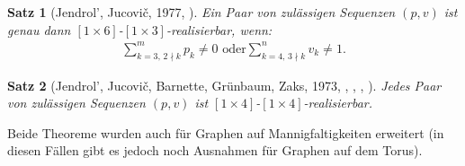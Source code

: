 \documentclass[10pt, notheorems]{beamer}
\newtheorem{theorem}{Satz}[section]
\begin{document}
\begin{frame}
  \begin{theorem}[{\sc Jendrol', Jucovi{\v{c}}}, 1977, \cite{jendrol1977generalization}] \label{thm:eberhard:extended:3}
    Ein Paar von zulässigen Sequenzen $(p, v)$ ist genau dann $[1 \times 6]$-$[1 \times 3]$-realisierbar, wenn:
    \begin{align*}
      \sum_{k=3,\,2 \nmid k}^{m} p_k \neq 0 \text{ oder} \sum_{k=4,\,3 \nmid k}^n v_k \neq 1.
    \end{align*}
  \end{theorem}
  \pause
  \begin{theorem}[{\sc Jendrol', Jucovi{\v{c}}, Barnette, Grünbaum, Zaks}, 1973, \cite{jucovivc1973theorem}, \cite{barnette1971toroidal}, \cite{grunbaum1969planar}, \cite{zaks1971analogue}] \label{thm:eberhard:extended:4}
    Jedes Paar von zulässigen Sequenzen $(p, v)$ ist $[1 \times 4]$-$[1 \times 4]$-realisierbar.
  \end{theorem}
  \pause
  Beide Theoreme wurden auch für Graphen auf Mannigfaltigkeiten erweitert (in diesen Fällen gibt es jedoch noch Ausnahmen für Graphen auf dem Torus).
\end{frame}
\end{document}
